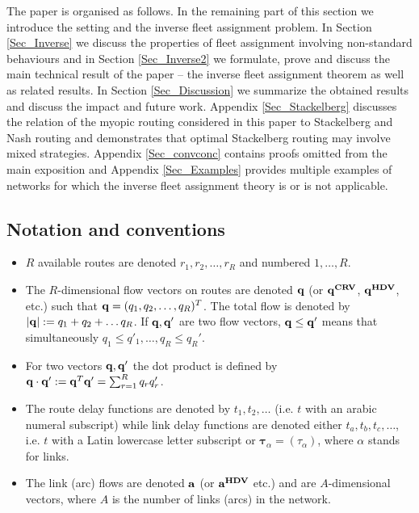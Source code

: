 \documentclass[a4paper,11pt]{article}
\begin{document}
The paper is organised as follows. In the remaining part of this section we introduce the setting and 
the inverse fleet assignment problem.  
In Section \ref{Sec_Inverse} we discuss the properties of fleet assignment involving non-standard behaviours and in Section \ref{Sec_Inverse2} we formulate, prove and discuss the main technical result of the paper -- the inverse fleet assignment theorem as well as related results. 
In Section \ref{Sec_Discussion} we summarize the obtained results and discuss the impact and future work. 
Appendix \ref{Sec_Stackelberg} discusses the relation of the myopic routing considered in this paper to Stackelberg and Nash routing and demonstrates that optimal Stackelberg routing may involve mixed strategies. 
Appendix \ref{Sec_convconc} contains proofs omitted from the main exposition and Appendix \ref{Sec_Examples} provides multiple examples of networks for which the inverse fleet assignment theory is or is not applicable. 


\subsection{Notation and conventions}
\begin{itemize}
\item $R$ available routes are denoted $r_1, r_2, \dots, r_R$ and numbered $1,\dots, R$.
\item The $R$-dimensional flow vectors on routes are denoted $\bold{q}$ (or $\bold{q^{CRV}}$, $\bold{q^{HDV}}$, etc.) such that $\bold{q} = (q_1, q_2, \dots, q_R)^T$. The total flow is denoted by $|\bold{q}| := q_1 + q_2 + \dots q_R$. If $\bold{q}, \bold{q'}$ are two flow vectors, $\bold{q} \le \bold{q'}$ means that simultaneously $q_1 \le q'_1, \dots, q_R \le q_R'$.  
\item For two vectors $\bold{q}, \bold{q'}$ the dot product is defined by $\bold{q} \cdot \bold{q'}:= \bold{q}^T \bold{q'} = \sum_{r=1}^R q_r q_r'$. 
\item The route delay functions are denoted by $t_1, t_2, \dots$ (i.e. $t$ with an arabic numeral subscript) while link delay functions are denoted either $t_a, t_b, t_c, \dots$, i.e. $t$ with a Latin lowercase letter subscript or $\boldsymbol{\tau}_{\alpha} = (\tau_{\alpha})$, where $\alpha$ stands for links. 
\item The link (arc) flows are denoted $\bold{a}$ (or $\bold{a^{HDV}}$ etc.) and are $A$-dimensional vectors, where $A$ is the number of links (arcs) in the network. 
\end{itemize}
\end{document}
